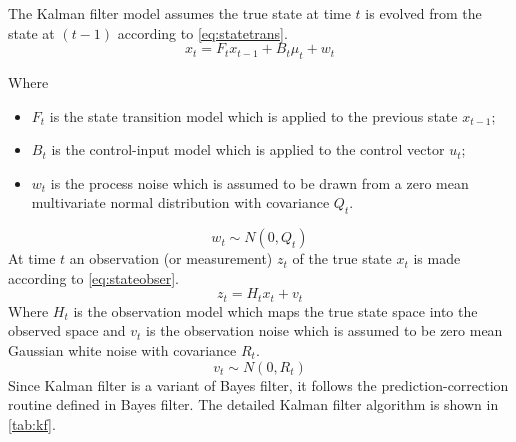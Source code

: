 The Kalman filter model assumes the true state at time $t$ is evolved from the state at $(t-1)$ according to \autoref{eq:statetrans}.
\begin{equation}
\label{eq:statetrans}
x_t = F_tx_{t-1}+B_t\mu_t+w_t
\end{equation}

Where
\begin{itemize}
  \item $F_t$ is the state transition model which is applied to the previous state $x_{t-1}$;
  \item $B_t$ is the control-input model which is applied to the control vector $u_t$;
  \item $w_t$ is the process noise which is assumed to be drawn from a zero mean multivariate normal distribution with covariance $Q_t$.
\end{itemize}
\begin{equation}
\label{eq:Q}
w_t \sim N(0,Q_t)
\end{equation}
At time $t$ an observation (or measurement) $z_t$ of the true state $x_t$ is made according to \autoref{eq:stateobser}.
\begin{equation}
\label{eq:stateobser}
z_t = H_tx_t + v_t
\end{equation}
Where $H_t$ is the observation model which maps the true state space into the observed space and $v_t$ is the observation noise which is assumed to be zero mean Gaussian white noise with covariance $R_t$.
\begin{equation}
\label{eq:R}
v_t \sim N(0,R_t)
\end{equation}
Since Kalman filter is a variant of Bayes filter, it follows the prediction-correction routine defined in Bayes filter. The detailed Kalman filter algorithm is shown in \autoref{tab:kf}. \\

